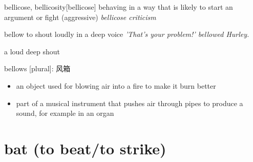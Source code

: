 \begin{DefWord}{bellicose, bellicosity}[bellicose]
    behaving in a way that is likely to start an argument or fight
    (aggressive)
    \textit{bellicose criticism}

\end{DefWord}

\begin{DefWord}{bellow}
    to shout loudly in a deep voice 
    \textit{'That's your problem!' bellowed Hurley.}

    a loud deep shout

    bellows [plural]: 风箱
\begin{itemize}
    \item an object used for blowing air into a fire to make it burn better
    \item part of a musical instrument that pushes air through pipes to produce a sound, for example in an organ
\end{itemize}

\end{DefWord}


\section{bat (to beat/to strike)}

